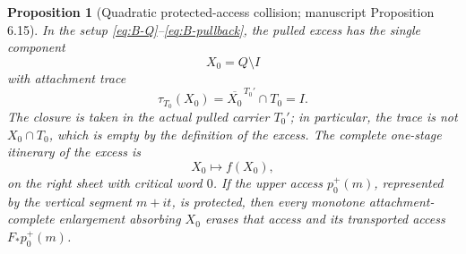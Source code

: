 \documentclass[11pt,reqno]{amsart}
\newtheorem{proposition}[theorem]{Proposition}
\theoremstyle{definition}
\theoremstyle{remark}
\begin{document}
\begin{proposition}[Quadratic protected-access collision; manuscript Proposition 6.15]\label{prop:access-collision}
In the setup \eqref{eq:B-Q}--\eqref{eq:B-pullback}, the pulled excess has the
single component
\[
X_0=Q\setminus I
\]
with attachment trace
\[
\tau_{T_0}(X_0)=\overline{X_0}^{\,T_0'}\cap T_0=I .
\]
The closure is taken in the actual pulled carrier $T_0'$; in particular, the
trace is not $X_0\cap T_0$, which is empty by the definition of the excess.
The complete one-stage itinerary of the excess is
\[
X_0\longmapsto f(X_0),
\]
on the right sheet with critical word $0$. If the upper access $p_0^{+}(m)$,
represented by the vertical segment $m+it$, is protected, then every monotone
attachment-complete enlargement absorbing $X_0$ erases that access and its
transported access $F_{*}p_0^{+}(m)$.
\end{proposition}
\end{document}

